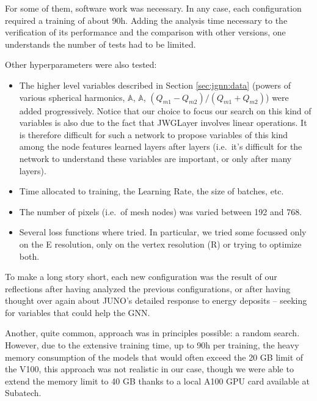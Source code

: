 \documentclass[../main.tex]{subfiles}
\begin{document}
\hfill

For some of them, software work was necessary. In any case, each configuration required a training of about 90h. Adding the analysis time necessary to the verification of its performance and the comparison with other versions, one understands the number of tests had to be limited.

Other hyperparameters were also tested:

\begin{itemize}

  \item The higher level variables described in Section \ref{sec:jgnn:data} (powers of various spherical harmonics, $\mathbb{A}$, $\mathbb{A}$, $(Q_{m1}-Q_{m2})/(Q_{m1}+Q_{m2})$) were added progressively. Notice that our choice to focus our search on this kind of variables is also due to the fact that JWGLayer involves linear operations. It is therefore difficult for such a network to propose variables of this kind among the node features learned layers after layers (i.e.\ it's difficult for the network to understand these variables are important, or only after many layers).


  \item Time allocated to training, the Learning Rate, the size of
    batches, etc.

  \item The number of pixels (i.e.\ of mesh nodes) was varied between 192 and 768.

  \item Several loss functions where tried. In particular, we tried some focussed only on the E resolution, only on the vertex resolution (R) or trying to optimize both.
\end{itemize}

\hfill

To make a long story short, each new configuration was the result of our reflections after having analyzed the previous configurations, or  after having thought over again about JUNO's detailed response to energy deposits -- seeking for variables that could help the GNN.

Another, quite common, approach  was in principles possible: a random search. However, due to the extensive training time, up to 90h per training, the heavy memory consumption of the models that would often exceed the 20 GB limit of the V100, this approach was not realistic in our case, though we were able to extend the memory limit to 40 GB thanks to a local A100 GPU card available at Subatech.
\end{document}
